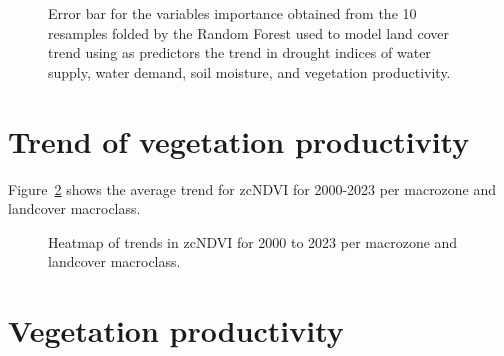 \documentclass[
  authoryear,
  preprint,
  3p,
  onecolumn]{elsarticle}
\begin{document}
\begin{figure}[!ht]
\begin{minipage}{0.33\linewidth}
{}


\end{minipage}%

\caption{\label{fig-RF_importance}Error bar for the variables importance
obtained from the 10 resamples folded by the Random Forest used to model
land cover trend using as predictors the trend in drought indices of
water supply, water demand, soil moisture, and vegetation productivity.}

\end{figure}%

\section{Trend of vegetation
productivity}\label{trend-of-vegetation-productivity}

Figure~\ref{fig-hetmaptrendzcNDVI} shows the average trend for zcNDVI
for 2000-2023 per macrozone and landcover macroclass.

\begin{figure}[!ht]


\caption{\label{fig-hetmaptrendzcNDVI}Heatmap of trends in zcNDVI for
2000 to 2023 per macrozone and landcover macroclass.}

\end{figure}%

\section{Vegetation productivity}\label{vegetation-productivity}
\end{document}
